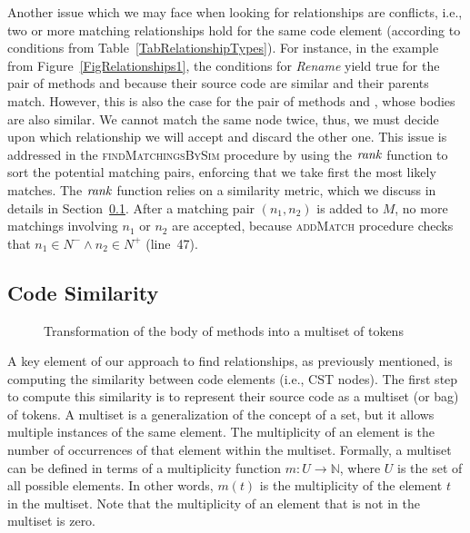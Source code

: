 Another issue which we may face when looking for relationships are conflicts, i.e., two or more matching relationships hold for the same code element (according to conditions from Table~\ref{TabRelationshipTypes}).
For instance, in the example from Figure~\ref{FigRelationships1}, the conditions for \textit{Rename} yield true for the pair of methods  and  because their source code are similar and their parents match.
However, this is also the case for the pair of methods  and , whose bodies are also similar.
We cannot match the same node twice, thus, we must decide upon which relationship we will accept and discard the other one.
This issue is addressed in the \textsc{findMatchingsBySim} procedure by using the $\operatorname{\mathit{rank}}$ function to sort the potential matching pairs, enforcing that we take first the most likely matches.
The $\operatorname{\mathit{rank}}$ function relies on a similarity metric, which we discuss in details in Section~\ref{SecCodeSim}.
After a matching pair $(n_1, n_2)$ is added to $M$, no more matchings involving $n_1$ or $n_2$ are accepted, because \textsc{addMatch} procedure checks that $n_1 \in N^- \land n_2 \in N^+$ (line~47).







\subsection{Code Similarity}
\label{SecCodeSim}

\begin{figure}[htb]
\renewcommand{\arraystretch}{1.3}
\centering
\footnotesize

\caption{Transformation of the body of methods into a multiset of tokens}
\label{FigSourceCodeTransformation}
\end{figure}

A key element of our approach to find relationships, as previously mentioned, is computing the similarity between code elements (i.e., CST nodes).
The first step to compute this similarity is to represent their source code as a multiset (or bag) of tokens.
A multiset is a generalization of the concept of a set, but it allows multiple instances of the same element.
The multiplicity of an element is the number of occurrences of that element within the multiset. Formally, a multiset can be defined in terms of a multiplicity function $m: U \to \mathbb{N}$, where $U$ is the set of all possible elements. In other words, $m(t)$ is the multiplicity of the element $t$ in the multiset. Note that the multiplicity of an element that is not in the multiset is zero.

